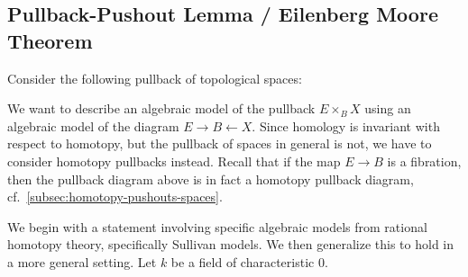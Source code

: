 \documentclass{scrartcl}
\theoremstyle{plain}
\theoremstyle{definition}
\renewcommand{\epsilon}{\varepsilon}
\newcommand{\from}{\leftarrow}
\DeclareMathOperator{\Sh}{Sh}
\DeclareMathOperator{\sgn}{sgn}
\begin{document}


\subsection{Pullback-Pushout Lemma / Eilenberg Moore Theorem}\label{subsec:eilenberg_moore}
Consider the following pullback of topological spaces:
\begin{center}\label{diag:pullback-eilenberg-moore}
\end{center}

We want to describe an algebraic model of the pullback $E\times_B X$ using an algebraic model of the diagram $E\to B\from X$. Since homology is invariant with respect to homotopy, but the pullback of spaces in general is not, we have to consider homotopy pullbacks instead. Recall that if the map $E\to B$ is a fibration, then the pullback diagram above is in fact a homotopy pullback diagram, cf.~\cref{subsec:homotopy-pushouts-spaces}. 

We begin with a statement involving specific algebraic models from rational homotopy theory, specifically Sullivan models. We then generalize this to hold in a more general setting. Let $k$ be a field of characteristic $0$. 
\end{document}
